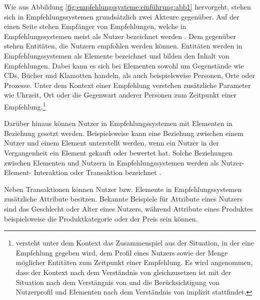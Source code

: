 Wie aus Abbildung \ref{fig:empfehlungssysteme:einführung:abb1} hervorgeht, stehen sich in  Empfehlungssystemen grundsätzlich zwei Akteure gegenüber.
Auf der einen Seite stehen Empfänger von Empfehlungen, welche in Empfehlungssystemen meist als Nutzer bezeichnet werden \cite[S. 8]{ricci:book}.
Dem gegenüber stehen Entitäten, die Nutzern empfohlen werden können.
Entitäten werden in Empfehlungssystemen als Elemente bezeichnet und bilden den Inhalt von Empfehlungen.
Dabei kann es sich bei Elementen sowohl um Gegenstände wie CDs, Bücher und Klamotten handeln, als auch beispielsweise Personen, Orte oder Prozesse.
Unter dem Kontext einer Empfehlung verstehen \textcite[S. 191]{ricci:book} zusätzliche Parameter wie Uhrzeit, Ort oder die Gegenwart anderer Personen zum Zeitpunkt einer Empfehlung.\footnote{\textcite[S. 1]{klahold:book} versteht unter dem Kontext das Zusammenspiel aus der Situation, in der eine Empfehlung gegeben wird, dem Profil eines Nutzers sowie der Menge möglicher Entitäten zum Zeitpunkt einer Empfehlung. Es wird angenommen, dass der Kontext nach dem Verständnis von \textcite{ricci:book} gleichzusetzen ist mit der Situation nach dem Verstängnis von \textcite{klahold:book} und die Berücksichtigung von Nutzerprofil und Elementen nach dem Verständnis von \textcite{ricci:book} implizit stattfindet.}

Darüber hinaus können Nutzer in Empfehlungssystemen mit Elementen in Beziehung gesetzt werden.
Beispielsweise kann eine Beziehung zwischen einem Nutzer und einem Element unterstellt werden, wenn ein Nutzer in der Vergangenheit ein Element gekauft oder bewertet hat.
Solche Beziehungen zwischen Elementen und Nutzern in Empfehlungssystemen werden als Nutzer- Element- Interaktion oder Transaktion bezeichnet \cite[S. 8]{recommenderSystems:2016}\cite[S. 9]{ricci:book}.

Neben Transaktionen können Nutzer bzw. Elemente in Empfehlungssystemen zusätzliche Attribute besitzen.
Bekannte Beispiele für Attribute eines Nutzers sind das Geschlecht oder Alter eines Nutzers, während Attribute eines Produktes beispielsweise die Produktkategorie oder der Preis sein können.

